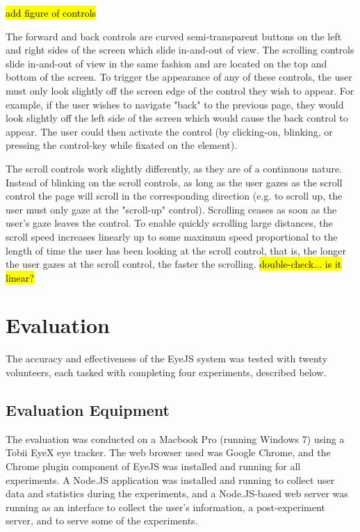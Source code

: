 \documentclass{sigchi}
\begin{document}
\hl{add figure of controls}

The forward and back controls are curved semi-transparent buttons on 
the left and right sides of the screen which slide in-and-out of view.
The scrolling controls slide in-and-out of view in the same fashion and
are located on the top and bottom of the screen. To trigger the 
appearance of any of these controls, the user must only look slightly 
off the screen edge of the control they wish to appear. For example, 
if the user wishes to navigate "back" to the previous page, they would
look slightly off the left side of the screen which would cause the 
back control to appear. The user could then activate the control (by
clicking-on, blinking, or pressing the control-key while fixated 
on the element).

The scroll controls work slightly differently, as they are of a 
continuous nature. Instead of blinking on the scroll controls, as long
as the user gazes as the scroll control the page will scroll in the
corresponding direction (e.g. to scroll up, the user must only gaze
at the "scroll-up" control). Scrolling ceases as soon as the user's 
gaze leaves the control. To enable quickly scrolling large distances,
the scroll speed increases linearly up to some maximum speed 
proportional to the length of time the user has been looking at the 
scroll control, that is, the longer the user gazes at the scroll
control, the faster the scrolling. \hl{double-check... is it linear?}

\section{Evaluation}
The accuracy and effectiveness of the EyeJS system was tested with 
twenty volunteers, each tasked with completing four experiments,
described below.

\subsection{Evaluation Equipment}
The evaluation was conducted on a Macbook Pro (running Windows 7) 
using a Tobii EyeX eye tracker. The web browser used was Google Chrome,
and the Chrome plugin component of EyeJS was installed and running for
all experiments. A Node.JS application was installed
and running to collect user data and statistics during the 
experiments, and a Node.JS-based web server was running as an interface
to collect the user's information, a post-experiment server, and to
serve some of the experiments.
\end{document}
